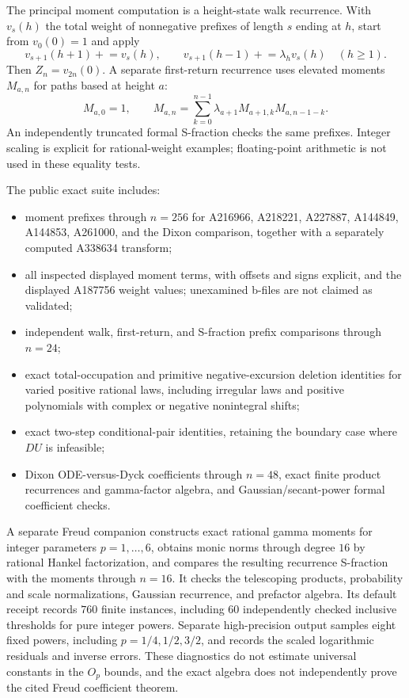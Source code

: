 \documentclass[11pt,letterpaper]{article}
\numberwithin{equation}{section}
\theoremstyle{remark}\newtheorem{remark}[theorem]{Remark}
\begin{document}
The principal moment computation is a height-state walk recurrence. With $v_s(h)$ the total weight of nonnegative prefixes of length $s$ ending at $h$, start from $v_0(0)=1$ and apply
\[
 v_{s+1}(h+1)\mathrel{+}=v_s(h),\qquad
 v_{s+1}(h-1)\mathrel{+}=\lambda_hv_s(h)\quad(h\ge1).
\]
Then $Z_n=v_{2n}(0)$. A separate first-return recurrence uses elevated moments $M_{a,n}$ for paths based at height $a$:
\[
 M_{a,0}=1,\qquad M_{a,n}=\sum_{k=0}^{n-1}\lambda_{a+1}M_{a+1,k}M_{a,n-1-k}.
\]
An independently truncated formal S-fraction checks the same prefixes. Integer scaling is explicit for rational-weight examples; floating-point arithmetic is not used in these equality tests.

The public exact suite includes:
\begin{itemize}[leftmargin=1.6em]
 \item moment prefixes through $n=256$ for A216966, A218221, A227887, A144849, A144853, A261000, and the Dixon comparison, together with a separately computed A338634 transform;
 \item all inspected displayed moment terms, with offsets and signs explicit, and the displayed A187756 weight values; unexamined b-files are not claimed as validated;
 \item independent walk, first-return, and S-fraction prefix comparisons through $n=24$;
 \item exact total-occupation and primitive negative-excursion deletion identities for varied positive rational laws, including irregular laws and positive polynomials with complex or negative nonintegral shifts;
 \item exact two-step conditional-pair identities, retaining the boundary case where $DU$ is infeasible;
 \item Dixon ODE-versus-Dyck coefficients through $n=48$, exact finite product recurrences and gamma-factor algebra, and Gaussian/secant-power formal coefficient checks.
\end{itemize}
A separate Freud companion constructs exact rational gamma moments for integer parameters $p=1,\ldots,6$, obtains monic norms through degree $16$ by rational Hankel factorization, and compares the resulting recurrence S-fraction with the moments through $n=16$. It checks the telescoping products, probability and scale normalizations, Gaussian recurrence, and prefactor algebra. Its default receipt records $760$ finite instances, including $60$ independently checked inclusive thresholds for pure integer powers. Separate high-precision output samples eight fixed powers, including $p=1/4,1/2,3/2$, and records the scaled logarithmic residuals and inverse errors. These diagnostics do not estimate universal constants in the $O_p$ bounds, and the exact algebra does not independently prove the cited Freud coefficient theorem.
\end{document}
